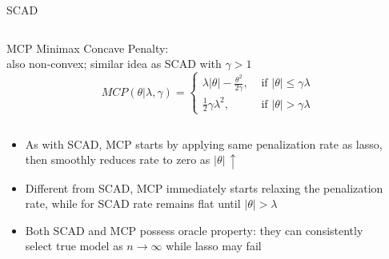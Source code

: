 \documentclass[11pt,compress,t,notes=noshow, xcolor=table]{beamer}
\begin{document}
\begin{vbframe}{SCAD }
\begin{columns}
\begin{column}{0.5\textwidth}
\end{column}

\end{columns}

\end{vbframe}

\begin{vbframe}{MCP }
Minimax Concave Penalty:\\
also non-convex; similar idea as SCAD with $\gamma>1$
$$
MCP(\theta | \lambda, \gamma)= \begin{cases}\lambda|\theta|-\frac{\theta^2}{2 \gamma}, & \text { if }|\theta| \leq \gamma \lambda \\ \frac{1}{2} \gamma \lambda^2, & \text { if }|\theta|>\gamma \lambda\end{cases}
$$

\begin{columns}

\begin{column}{0.4\textwidth}

{\scriptsize
\begin{itemize}\setlength{\itemsep}{1.0em}
    \item As with SCAD, MCP starts by applying same penalization rate as lasso, then smoothly reduces rate to zero as $|\theta|\,\uparrow$
    \item Different from SCAD, MCP immediately starts relaxing the penalization rate, while for SCAD rate remains flat until $|\theta|>\lambda$
    \item Both SCAD and MCP possess oracle property: they can consistently select true model as $n \to \infty$ while lasso may fail
\end{itemize}
}
\end{column}

\begin{column}{0.6\textwidth}


\end{column}
\end{columns}
\end{vbframe}
\end{document}

